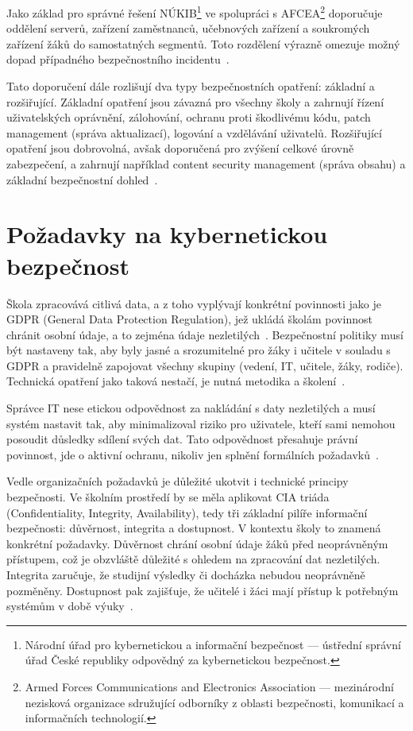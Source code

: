 \documentclass[male,czech,api_bc]{kitheses}
\begin{document}
Jako základ pro správné řešení NÚKIB\footnote{Národní úřad pro kybernetickou 
a informační bezpečnost — ústřední správní úřad České republiky odpovědný za 
kybernetickou bezpečnost.} ve spolupráci s AFCEA\footnote{Armed Forces 
Communications and Electronics Association — mezinárodní nezisková organizace 
sdružující odborníky z oblasti bezpečnosti, komunikací a informačních technologií.} 
doporučuje oddělení serverů, zařízení zaměstnanců, učebnových zařízení 
a soukromých zařízení žáků do samostatných segmentů. Toto rozdělení výrazně 
omezuje možný dopad případného bezpečnostního incidentu~\cite{AFCEA2024}.

Tato doporučení dále rozlišují dva typy bezpečnostních opatření: základní a rozšiřující. Základní opatření jsou závazná pro všechny školy a zahrnují řízení uživatelských oprávnění, zálohování, ochranu proti škodlivému kódu, patch management (správa aktualizací), logování a vzdělávání uživatelů. Rozšiřující opatření jsou dobrovolná, avšak doporučená pro zvýšení celkové úrovně zabezpečení, a zahrnují například content security management (správa obsahu) a základní bezpečnostní dohled~\cite{AFCEA2024}.

\section{Požadavky na kybernetickou bezpečnost}
Škola zpracovává citlivá data, a z toho vyplývají konkrétní povinnosti jako je GDPR (General Data Protection Regulation), jež ukládá školám povinnost chránit osobní údaje, a to zejména údaje nezletilých~\cite{GDPR2016}. Bezpečnostní politiky musí být nastaveny tak, aby byly jasné a srozumitelné pro žáky i učitele v souladu s GDPR a pravidelně zapojovat všechny skupiny (vedení, IT, učitele, žáky, rodiče). Technická opatření jako taková nestačí, je nutná metodika a školení~\cite{Benes2024}.

Správce IT nese etickou odpovědnost za nakládání s daty nezletilých a musí systém nastavit tak, aby minimalizoval riziko pro uživatele, kteří sami nemohou posoudit důsledky sdílení svých dat. Tato odpovědnost přesahuje právní povinnost, jde o aktivní ochranu, nikoliv jen splnění formálních požadavků~\cite{Benes2024, AFCEA2024}.

Vedle organizačních požadavků je důležité ukotvit i technické principy bezpečnosti. Ve školním prostředí by se měla aplikovat CIA triáda (Confidentiality, Integrity, Availability), tedy tři základní pilíře informační bezpečnosti: důvěrnost, integrita a dostupnost. V kontextu školy to znamená konkrétní požadavky. Důvěrnost chrání osobní údaje žáků před neoprávněným přístupem, což je obzvláště důležité s ohledem na zpracování dat nezletilých. Integrita zaručuje, že studijní výsledky či docházka nebudou neoprávněně pozměněny. Dostupnost pak zajišťuje, že učitelé i žáci mají přístup k potřebným systémům v době výuky~\cite{Benes2024}.
\end{document}
